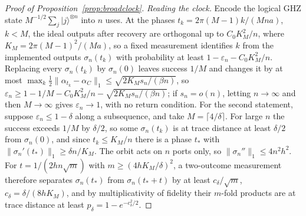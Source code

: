 \documentclass[11pt]{article}
\theoremstyle{definition}
\theoremstyle{remark}
\begin{document}
\begin{proof}[Proof of Proposition~\ref{prop:broadclock}]
\emph{Reading the clock.} Encode the logical GHZ state $M^{-1/2}\sum_j|j\rangle^{\otimes n}$ into $n$ uses. At the phases $t_k=2\pi(M-1)k/(Mna)$, $k<M$, the ideal outputs after recovery are orthogonal up to $C_0K_M^2/n$, where $K_M=2\pi(M-1)^2/(Ma)$, so a fixed measurement identifies $k$ from the implemented outputs $\sigma_n(t_k)$ with probability at least $1-\varepsilon_n-C_0K_M^2/n$. Replacing every $\sigma_n(t_k)$ by $\sigma_n(0)$ leaves success $1/M$ and changes it by at most $\max_k\tfrac12\|\alpha_{t_k}-\alpha_C\|_1\le\sqrt{2K_Ms_n/(\beta n)}$, so $\varepsilon_n\ge1-1/M-C_0K_M^2/n-\sqrt{2K_Ms_n/(\beta n)}$; if $s_n=o(n)$, letting $n\to\infty$ and then $M\to\infty$ gives $\varepsilon_n\to1$, with no return condition. For the second statement, suppose $\varepsilon_n\le1-\delta$ along a subsequence, and take $M=\lceil4/\delta\rceil$. For large $n$ the success exceeds $1/M$ by $\delta/2$, so some $\sigma_n(t_k)$ is at trace distance at least $\delta/2$ from $\sigma_n(0)$, and since $t_k\le K_M/n$ there is a phase $t_*$ with $\|\sigma_n'(t_*)\|_1\ge\delta n/K_M$. The orbit acts on $n$ ports only, so $\|\sigma_n''\|_1\le4n^2h^2$. For $t=1/(2hn\sqrt m)$ with $m\ge(4hK_M/\delta)^2$, a two-outcome measurement therefore separates $\sigma_n(t_*)$ from $\sigma_n(t_*+t)$ by at least $c_\delta/\sqrt m$, $c_\delta=\delta/(8hK_M)$, and by multiplicativity of fidelity their $m$-fold products are at trace distance at least $p_\delta=1-e^{-c_\delta^2/2}$.


\end{proof}
\end{document}
